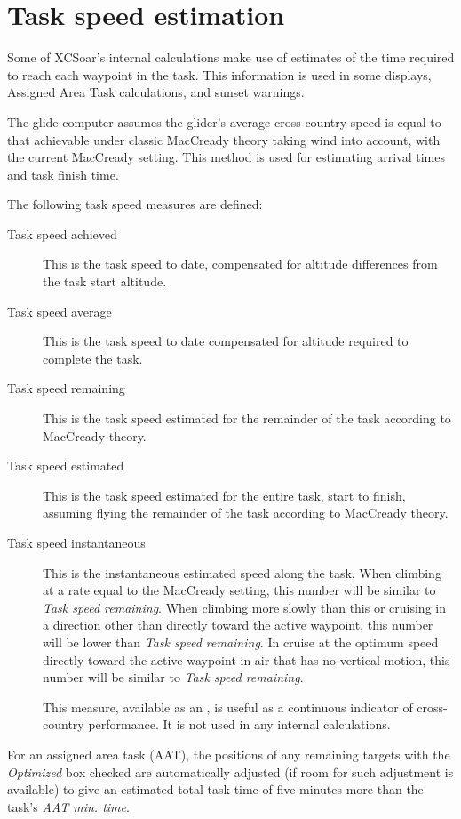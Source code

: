 \section{Task speed estimation}\label{sec:task-speed-estim}

Some of XCSoar's internal calculations make use of estimates of the
time required to reach each waypoint in the task.  This information is
used in some {\InfoBox} displays, Assigned Area Task calculations, and
sunset warnings.

The glide computer assumes the glider's average cross-country speed is
equal to that achievable under classic MacCready theory taking wind
into account, with the current MacCready setting.  This method is used
for estimating arrival times and task finish time.

The following task speed measures are defined:
\begin{description}
\item[Task speed achieved]  This is the task speed to date, compensated
for altitude differences from the task start altitude.
\item[Task speed average]  This is the task speed to date compensated
for altitude required to complete the task.
\item[Task speed remaining]  This is the task speed estimated for the
  remainder of the task according to MacCready theory.
\item[Task speed estimated]  This is the task speed estimated for the entire 
task, start to finish, assuming flying the remainder of the task according 
to MacCready theory.
\item[Task speed instantaneous]  This is the instantaneous estimated speed 
along the task.  When climbing at a rate equal to the MacCready setting, this 
number will be similar to \emph{Task speed remaining}.  When climbing more slowly 
than this or cruising in a direction other than directly toward the active 
waypoint, this number will be lower than \emph{Task speed remaining}.  In cruise 
at the optimum speed directly toward the active waypoint in air that has no 
vertical motion, this number will be similar to \emph{Task speed remaining}.

This measure, available as an {\InfoBox}, is useful as a continuous
indicator of cross-country performance.  It is not used in any
internal calculations.
\end{description}

\tip{}For an assigned area task (AAT), the positions of any remaining targets 
with the \emph{Optimized} box checked are automatically adjusted (if room for 
such adjustment is available) to give an estimated total task time of five 
minutes more than the task's \emph{AAT min. time}.

